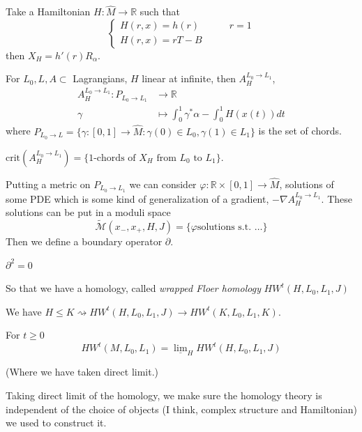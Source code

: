 \begin{remark}
\label{remark-Hamiltonian}
Take a Hamiltonian $H: \hat{M}\to \mathbb{R}$
such that
$$
\begin{cases}
H(r,x)=h(r)\qquad &r=1 \\
H(r,x)=rT-B\qquad &
\end{cases}
$$
then $X_H=h'(r)R_\alpha$.

For $L_0,L,A\subset$ Lagrangians, $H$ linear
at infinite,
then $A_{H}^{L_0 \to L_1}$,
$$
\begin{aligned}
A_{H}^{L_0 \to L_1}: P_{L_0\to L_1}
&\longrightarrow \mathbb{R} \\
\gamma &\longmapsto \int_0^1 \gamma^* \alpha-
\int_0^1H(x(t))dt
\end{aligned}
$$
where $P_{L_0\to L} =\{\gamma:[0,1] \to
\hat{M}:\gamma(0) \in L_0,
\gamma(1) \in L_1\}
$ is the set of chords.
\end{remark}

\begin{remark}
\label{remark-1-chords-are-crticial-points}
$\text{crit}(A_{H}^{L_0 \to
L_1})=\{\text{1-chords of $X_H$ from
 $L_0$ to $L_1$}\}$.
\end{remark}

Putting a metric on $P_{L_0 \to L_1}$ we can
consider $\varphi:\mathbb{R} \times
[0,1] \to \hat{M}$, solutions of some PDE
which is some kind
of generalization of a gradient, $- \nabla
A_{H}^{L_0 \to L_1}$.
These solutions can be put in a moduli space
$$
\tilde{\mathcal{M}}(x_-,x_+,H,J)=
\{\varphi\text{
solutions s.t. …}\}
$$
Then we define a boundary operator
$\partial$.
\begin{theorem}
\label{theorem-homology}
$\partial^2=0$
\end{theorem}

So that we have a homology, called {\it
wrapped Floer homology}
$HW^t(H,L_0,L_1,J)$

\begin{remark}
\label{remark-embedding}
We have $H \leq  K \rightsquigarrow
HW^t(H,L_0,L_1,J) \to
HW^t(K,L_0,L_1,K)$.
\end{remark}

\begin{definition}
\label{definition-direct-limit}
For $t \geq 0$
$$
HW^t(M,L_0,L_1)=\underline{\lim }_H
HW^t(H,L_0,L_1,J)
$$
\end{definition}

(Where we have taken direct limit.)

Taking direct limit of the homology,
we make sure the homology theory is
independent of the
choice of objects (I think, complex structure
and Hamiltonian)
we used to construct it.


